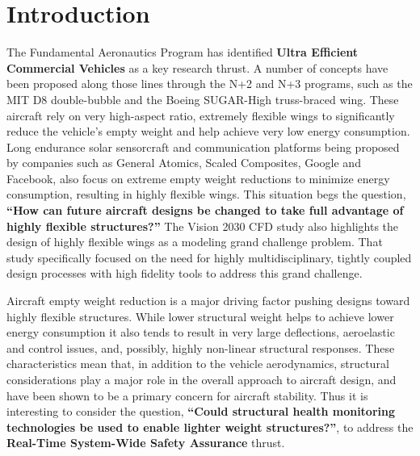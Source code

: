 \documentclass[]{aiaa-tc}
\begin{document}
  \newpage

  \section{Introduction}

    The Fundamental Aeronautics Program has identified \textbf{Ultra Efficient Commercial Vehicles} as 
    a key research thrust. A number of concepts have been proposed along those lines through the N+2 and N+3 programs, such as 
    the MIT D8 double­-bubble and the Boeing SUGAR­-High truss­-braced wing. These aircraft rely on 
    very high­-aspect ratio, extremely flexible wings to significantly reduce the vehicle's empty weight and help achieve very low energy consumption. 
    Long endurance solar sensorcraft and communication platforms being proposed by companies such as General Atomics,
    Scaled Composites, Google and Facebook, also focus on extreme empty weight reductions to minimize energy consumption, resulting in highly 
    flexible wings. This situation begs the question, \textbf{``How can future aircraft designs be changed to take full 
    advantage of highly flexible structures?''} The Vision 2030 CFD study\cite{vision2030} also highlights the 
    design of highly flexible wings as a modeling grand challenge problem. That study specifically 
    focused on the need for highly multidisciplinary, tightly coupled design processes with high 
    fidelity tools to address this grand challenge.

    Aircraft empty weight reduction is a major driving factor pushing designs toward highly flexible structures. 
    While lower structural weight helps to achieve lower energy consumption it also tends to result in very large 
    deflections, aeroelastic and control issues, and, possibly, highly non-linear structural responses. These characteristics mean that, in addition to the vehicle aerodynamics,
    structural considerations play a major role in the overall approach to aircraft design, and have been shown to be a primary 
    concern for aircraft stability\cite{heliosfailure_2007}. Thus it is interesting to consider the question, 
    \textbf{``Could structural health monitoring technologies be used to enable lighter 
    weight structures?''}, to address the \textbf{Real­-Time System­-Wide Safety Assurance} thrust. 
\end{document}
